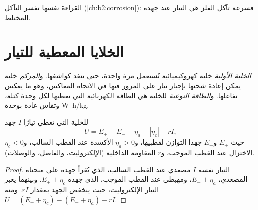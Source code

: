 القراءة نفسها تفسر التآكل (\cref{ch:b2:corrosion}): فسرعة تآكل
الفلز هي التيار عند جهده المختلط.

\section{الخلايا المعطية للتيار}

\begin{definition}[البطاريات]\label{def:b2:batteries-electrolysis:battery}
\emph{الخلية الأولية} خلية كهروكيميائية تُستعمل
مرة واحدة، حتى تنفد كواشفها. و\emph{المركم}
خلية يمكن إعادة شحنها بإجبار تيار على المرور فيها في
الاتجاه المعاكس، وهو ما يعكس تفاعلها. و\emph{الطاقة
النوعية} للخلية هي الطاقة الكهربائية التي تعطيها
لكل وحدة كتلة، وتقاس عادة بوحدة \unit{W.h/kg}.
\end{definition}

\begin{proposition}\label{prop:b2:batteries-electrolysis:delivering}
للخلية التي تعطي تيارًا $I$ جهد
\[
  U = E_+ - E_- - \eta_a - |\eta_c| - rI ,
\]
حيث $E_+$ و$E_-$ جهدا التوازن لقطبيها،
و$\eta_a > 0$  الأكسدة عند القطب السالب،
و$\eta_c < 0$  الاختزال عند القطب الموجب، و$r$ المقاومة
الداخلية (الإلكتروليت، والفاصل، والوصلات).
\end{proposition}

\begin{proof}
التيار نفسه $I$ مصعدي عند القطب السالب، الذي يُقرأ جهده
على منحناه المصعدي، $E_- + \eta_a$، ومهبطي عند القطب الموجب،
الذي جهده $E_+ + \eta_c$. وبينهما يعبر التيار
الإلكتروليت، حيث ينخفض الجهد بمقدار $rI$. ومنه $U = (E_+ + \eta_c) - (E_- +
\eta_a) - rI$.
\end{proof}

